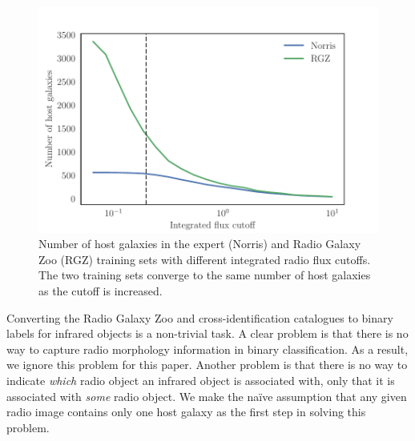 \documentclass[fleqn,usenatbib,usedcolumn]{mnras}
\begin{document}
    \begin{figure}
      \centering
      \includegraphics[width=\columnwidth]{images/host_galaxies_flux_cutoff.pdf}
      \caption{Number of host galaxies in the expert (Norris) and Radio Galaxy
        Zoo (RGZ) training sets with different integrated radio flux cutoffs.
        The two training sets converge to the same number of host galaxies as
        the cutoff is increased.}
      \label{fig:distribution-cutoffs}
    \end{figure}

    Converting the Radio Galaxy Zoo and \citet{norris06} cross-identification
    catalogues to binary labels for infrared objects is a non-trivial task. A
    clear problem is that there is no way to capture radio morphology
    information in binary classification. As a result, we ignore this problem
    for this paper. Another problem is that there is no way to indicate
    \emph{which} radio object an infrared object is associated with, only that
    it is associated with \emph{some} radio object. We make the na\"ive
    assumption that any given radio image contains only one host galaxy as the
    first step in solving this problem.
\end{document}
